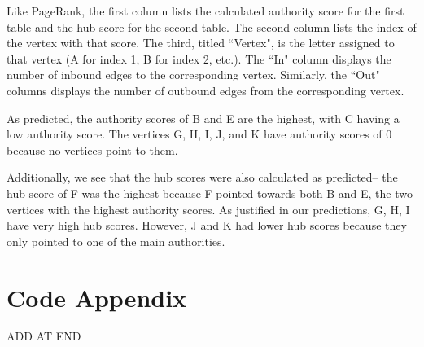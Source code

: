 \documentclass[12pt, titlepage, twoside]{amsart}
\begin{document}
Like PageRank, the first column lists the calculated
authority score for the first table and the hub score for the second table.
The second column lists the index of the vertex with that score.
The third, titled ``Vertex", is the letter assigned to that vertex (A for index 1, B for index 2, etc.).
The ``In" column displays the number of inbound edges to the corresponding vertex.
Similarly, the ``Out" columns displays the number of outbound edges from the corresponding vertex.

As predicted, the authority scores of B and E are the highest, with C having a low authority score.
The vertices G, H, I, J, and K have authority scores of 0 because no vertices point to them.

Additionally, we see that the hub scores were also calculated as predicted--
the hub score of F was the highest because F pointed towards both B and E,
the two vertices with the highest authority scores. As justified in our predictions, G, H, I
have very high hub scores. However, J and K had lower hub scores because they only pointed to one of the main authorities.

\section{Code Appendix}

ADD AT END
\end{document}
